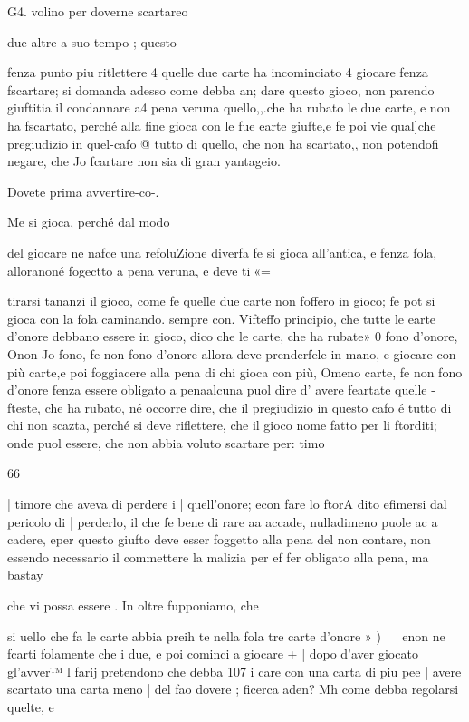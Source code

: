 \documentclass[12pt,a6paper]{article}
\begin{document}
 

 

 

G4.
volino per doverne scartareo

due altre a suo tempo ; questo

fenza punto piu ritlettere 4 quelle due carte ha incominciato 4
giocare fenza fscartare; si domanda adesso come debba an;
dare questo gioco, non parendo
giuftitia il condannare a4 pena
veruna quello,,.che ha rubato le
due carte, e non ha fscartato,
perché alla fine gioca con le fue
earte giufte,e fe poi vie qual]che pregiudizio in quel-cafo @
tutto di quello, che non ha scartato,, non potendofi negare, che
Jo fcartare non sia di gran yantageio.

Dovete prima avvertire-co-.

Me si gioca, perché dal modo

del giocare ne nafce una refoluZione diverfa fe si gioca all’antica, e fenza fola, alloranoné
fogectto a pena veruna, e deve
ti«=

tirarsi tananzi il gioco, come fe
quelle due carte non foffero in
gioco; fe pot si gioca con la
fola caminando. sempre con.
Vifteffo principio, che tutte le
earte d’onore debbano essere in
gioco, dico che le carte, che ha
rubate» 0 fono d’onore, Onon
Jo fono, fe non fono d’onore
allora deve prenderfele in mano, e giocare con più carte,e
poi foggiacere alla pena di chi
gioca con più, Omeno carte,
fe non fono d’onore fenza essere obligato a penaalcuna puol
dire d' avere feartate quelle
- fteste, che ha rubato, né occorre dire, che il pregiudizio in
questo cafo é tutto di chi non
scazta, perché si deve riflettere,
che il gioco nome fatto per li
ftorditi; onde puol essere, che
non abbia voluto scartare per:
timo  

66

| timore che aveva di perdere
i | quell’onore; econ fare lo ftorA dito efimersi dal pericolo di
| perderlo, il che fe bene di rare
aa accade, nulladimeno puole ac
a cadere, eper questo giufto deve
esser foggetto alla pena del non
contare, non essendo necessario
il commettere la malizia per ef
fer obligato alla pena, ma bastay

che vi possa essere .
In oltre fupponiamo, che

si uello che fa le carte abbia preih te nella fola tre carte d’onore »
) ~~ enon ne fcarti folamente che
i due, e poi cominci a giocare +
| dopo d’aver giocato gl’avver™
l farij pretendono che debba 107
i care con una carta di piu pee
| avere scartato una carta meno
| del fao dovere ; ficerca aden?
Mh come debba regolarsi quelte, e
\end{document}
